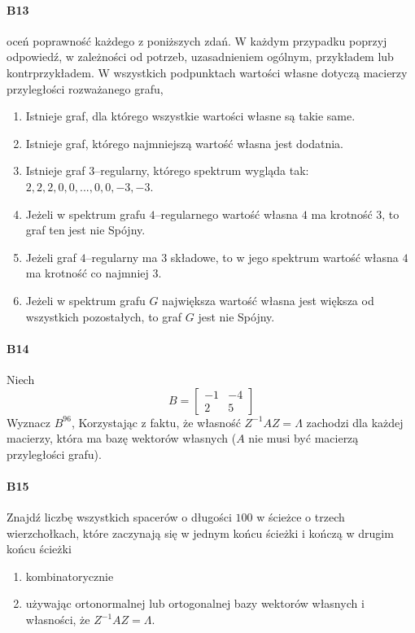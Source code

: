 \documentclass[a4paper,12pt]{article}
\theoremstyle{definition}%
\theoremstyle{definition}
\theoremstyle{problem}
\begin{document}
\paragraph{B13} oceń poprawność każdego z poniższych zdań. W każdym przypadku poprzyj odpowiedź, w zależności od potrzeb, uzasadnieniem ogólnym, przykładem lub kontrprzykładem. W wszystkich podpunktach wartości własne dotyczą macierzy przyległości rozważanego grafu,
\begin{enumerate}[label=\alph*)]
\item  Istnieje graf, dla którego wszystkie wartości własne są takie same.
\item  Istnieje graf, którego najmniejszą wartość własna jest dodatnia.
\item  Istnieje graf $3$–regularny, którego spektrum wygląda tak: $2, 2, 2, 0, 0, . . . , 0, 0, -3, -3$.
\item  Jeżeli w spektrum grafu $4$–regularnego wartość własna $4$ ma krotność $3$, to graf ten jest nie Spójny.
\item  Jeżeli graf $4$–regularny ma $3$ składowe, to w jego spektrum wartość własna $4$ ma krotność co najmniej $3$.
\item  Jeżeli w spektrum grafu $G$ największa wartość własna jest większa od wszystkich pozostałych, to graf $G$ jest nie Spójny.
\end{enumerate}

\paragraph{B14} Niech 
$$B=\begin{bmatrix}
-1&-4\\
2&5
\end{bmatrix}$$
Wyznacz $B^{96}$, Korzystając z faktu, że własność $Z^{-1}AZ = \Lambda$ zachodzi dla każdej macierzy, która ma bazę wektorów własnych ($A$ nie musi być macierzą przyległości grafu).

\paragraph{B15} Znajdź liczbę wszystkich spacerów o długości $100$ w ścieżce o trzech wierzchołkach, które zaczynają się w jednym końcu ścieżki i kończą w drugim końcu ścieżki
\begin{enumerate}[label=\alph*)]
\item kombinatorycznie
\item używając ortonormalnej lub ortogonalnej bazy wektorów własnych i własności, że $Z^{-1}AZ = \Lambda $.
\end{enumerate}
\end{document}
